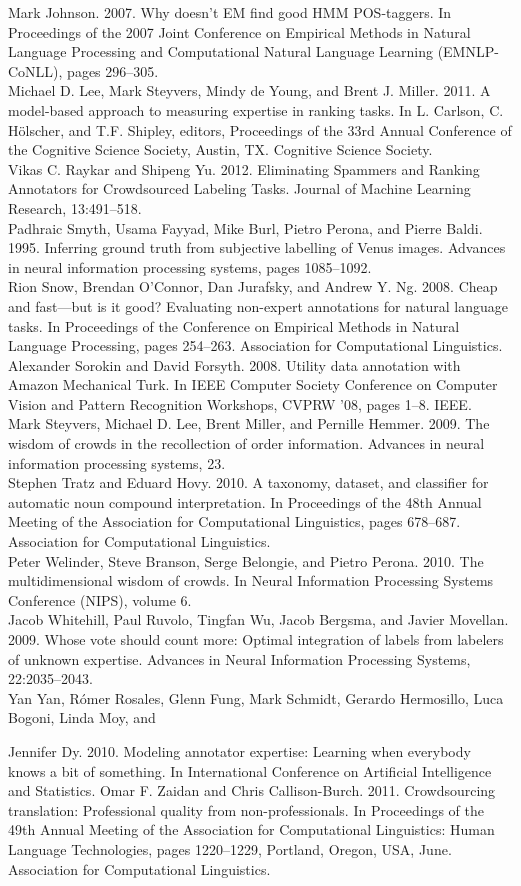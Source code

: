 \documentclass[
]{article}
\begin{document}
Mark Johnson. 2007. Why doesn't EM find good HMM POS-taggers. In
Proceedings of the 2007 Joint Conference on Empirical Methods in Natural
Language Processing and Computational Natural Language Learning
(EMNLP-CoNLL), pages 296--305.\\
Michael D. Lee, Mark Steyvers, Mindy de Young, and Brent J. Miller.
2011. A model-based approach to measuring expertise in ranking tasks. In
L. Carlson, C. Hölscher, and T.F. Shipley, editors, Proceedings of the
33rd Annual Conference of the Cognitive Science Society, Austin, TX.
Cognitive Science Society.\\
Vikas C. Raykar and Shipeng Yu. 2012. Eliminating Spammers and Ranking
Annotators for Crowdsourced Labeling Tasks. Journal of Machine Learning
Research, 13:491--518.\\
Padhraic Smyth, Usama Fayyad, Mike Burl, Pietro Perona, and Pierre
Baldi. 1995. Inferring ground truth from subjective labelling of Venus
images. Advances in neural information processing systems, pages
1085--1092.\\
Rion Snow, Brendan O'Connor, Dan Jurafsky, and Andrew Y. Ng. 2008. Cheap
and fast---but is it good? Evaluating non-expert annotations for natural
language tasks. In Proceedings of the Conference on Empirical Methods in
Natural Language Processing, pages 254--263. Association for
Computational Linguistics.\\
Alexander Sorokin and David Forsyth. 2008. Utility data annotation with
Amazon Mechanical Turk. In IEEE Computer Society Conference on Computer
Vision and Pattern Recognition Workshops, CVPRW '08, pages 1--8. IEEE.\\
Mark Steyvers, Michael D. Lee, Brent Miller, and Pernille Hemmer. 2009.
The wisdom of crowds in the recollection of order information. Advances
in neural information processing systems, 23.\\
Stephen Tratz and Eduard Hovy. 2010. A taxonomy, dataset, and classifier
for automatic noun compound interpretation. In Proceedings of the 48th
Annual Meeting of the Association for Computational Linguistics, pages
678--687. Association for Computational Linguistics.\\
Peter Welinder, Steve Branson, Serge Belongie, and Pietro Perona. 2010.
The multidimensional wisdom of crowds. In Neural Information Processing
Systems Conference (NIPS), volume 6.\\
Jacob Whitehill, Paul Ruvolo, Tingfan Wu, Jacob Bergsma, and Javier
Movellan. 2009. Whose vote should count more: Optimal integration of
labels from labelers of unknown expertise. Advances in Neural
Information Processing Systems, 22:2035--2043.\\
Yan Yan, Rómer Rosales, Glenn Fung, Mark Schmidt, Gerardo Hermosillo,
Luca Bogoni, Linda Moy, and

Jennifer Dy. 2010. Modeling annotator expertise: Learning when everybody
knows a bit of something. In International Conference on Artificial
Intelligence and Statistics. Omar F. Zaidan and Chris Callison-Burch.
2011. Crowdsourcing translation: Professional quality from
non-professionals. In Proceedings of the 49th Annual Meeting of the
Association for Computational Linguistics: Human Language Technologies,
pages 1220--1229, Portland, Oregon, USA, June. Association for
Computational Linguistics.
\end{document}
